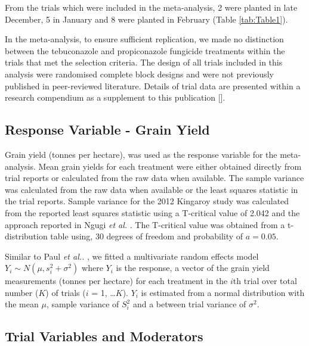 \documentclass[agronomy,article,submit,moreauthors,pdftex]{mdpi}
\begin{document}
From the trials which were included in the meta-analysis, 2 were planted in late December, 5 in January and 8 were planted in February (Table \ref{tab:Table1}).

In the meta-analysis, to ensure sufficient replication, we made no distinction between the tebuconazole and propiconazole fungicide treatments within the trials that met the selection criteria.
The design of all trials included in this analysis were randomised complete block designs and were not previously published in peer-reviewed literature.
Details of trial data are presented within a research compendium as a supplement to this publication {[}{]}.

\hypertarget{response-variable---grain-yield}{%
\subsection{Response Variable - Grain Yield}\label{response-variable---grain-yield}}

Grain yield (tonnes per hectare), was used as the response variable for the meta-analysis.
Mean grain yields for each treatment were either obtained directly from trial reports or calculated from the raw data when available.
The sample variance was calculated from the raw data when available or the least squares statistic in the trial reports.
Sample variance for the 2012 Kingaroy study was calculated from the reported least squares statistic using a T-critical value of 2.042 and the approach reported in Ngugi \emph{et al.} \citeyearpar{Ngugi2011}.
The T-critical value was obtained from a t-distribution table using, 30 degrees of freedom and probability of \(a = 0.05\).

Similar to Paul \emph{et al..} \citeyearpar{Paul2007}, we fitted a multivariate random effects model
\(Y_i \sim N(\mu,s_i^2 + \sigma^2)\)
where \(Y_i\) is the response, a vector of the grain yield measurements (tonnes per hectare) for each treatment in the \(i\)th trial over total number (\(K\)) of trials (\(i\) = 1, \ldots{}\(K\)).
\(Y_i\) is estimated from a normal distribution with the mean \(\mu\), sample variance of \(S_i^2\) and a between trial variance of \(\sigma^2\).

\hypertarget{trial-variables-and-moderators}{%
\subsection{Trial Variables and Moderators}\label{trial-variables-and-moderators}}
\end{document}
